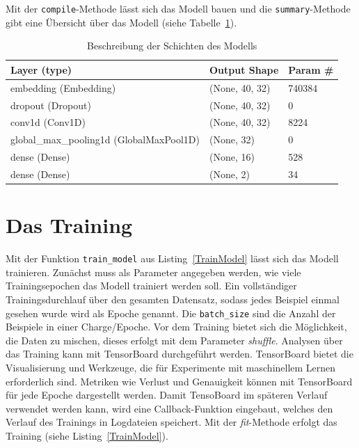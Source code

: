 Mit der \texttt{compile}-Methode lässt sich das Modell bauen und die \texttt{summary}-Methode gibt eine Übersicht über das Modell (siehe Tabelle~\ref{modellBesch}).


\begin{table}[h]
    \caption{Beschreibung der Schichten des Modells}
    \label{modellBesch}
    \renewcommand{\arraystretch}{1.2}
    \centering
    \sffamily
    \begin{footnotesize}
        \begin{tabular}{l l l}
            \toprule
            \textbf{Layer (type)}                  & \textbf{Output Shape} & \textbf{Param \#} \\
            \midrule
            embedding (Embedding)  & (None, 40, 32) & 740384                \\
            dropout (Dropout)  & (None, 40, 32) &     0      \\
            conv1d (Conv1D)                  & (None, 40, 32)     &    8224     \\
            global\_max\_pooling1d (GlobalMaxPool1D)   & (None, 32)                    &     0   \\
            dense (Dense)    & (None, 16)     &  528      \\
            dense (Dense)   & (None, 2)     & 34                      \\
            \bottomrule
        \end{tabular}
    \end{footnotesize}
    \rmfamily
\end{table}

\section{Das Training}

Mit der Funktion \texttt{train\_model} aus Listing~\ref{TrainModel} lässt sich das Modell trainieren. Zunächst muss als Parameter angegeben werden, wie viele Trainingsepochen das Modell trainiert werden soll. Ein vollständiger Trainingsdurchlauf über den gesamten Datensatz, sodass jedes Beispiel einmal gesehen wurde wird als Epoche genannt. Die \texttt{batch\_size} sind die Anzahl der Beispiele in einer Charge/Epoche. Vor dem Training bietet sich die Möglichkeit, die Daten zu mischen, dieses erfolgt mit dem Parameter \textit{shuffle}. Analysen über das Training kann mit TensorBoard durchgeführt werden. TensorBoard bietet die Visualisierung und Werkzeuge, die für Experimente mit maschinellem Lernen erforderlich sind. Metriken wie Verlust und Genauigkeit können mit TensorBoard für jede Epoche dargestellt werden. Damit TensoBoard im späteren Verlauf verwendet werden kann, wird eine Callback-Funktion eingebaut, welches den Verlauf des Trainings in Logdateien speichert. Mit der \textit{fit}-Methode erfolgt das Training (siehe Listing~\ref{TrainModel}).


